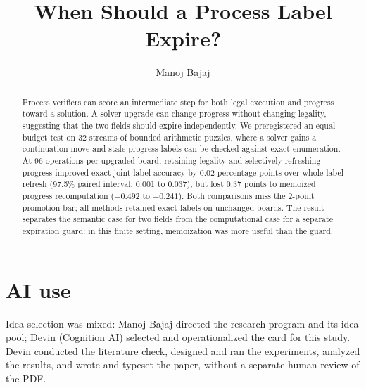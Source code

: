 \documentclass[11pt]{article}
\title{\textbf{When Should a Process Label Expire?}}
\author{Manoj Bajaj}
\date{}
\begin{document}
\maketitle
\begin{abstract}
Process verifiers can score an intermediate step for both legal execution and progress toward a solution.
A solver upgrade can change progress without changing legality, suggesting that the two fields should expire independently.
We preregistered an equal-budget test on 32 streams of bounded arithmetic puzzles, where a solver gains a continuation move and stale progress labels can be checked against exact enumeration.
At 96 operations per upgraded board, retaining legality and selectively refreshing progress improved exact joint-label accuracy by 0.02 percentage points over whole-label refresh (97.5\% paired interval: 0.001 to 0.037), but lost 0.37 points to memoized progress recomputation (\(-0.492\) to \(-0.241\)).
Both comparisons miss the 2-point promotion bar; all methods retained exact labels on unchanged boards.
The result separates the semantic case for two fields from the computational case for a separate expiration guard: in this finite setting, memoization was more useful than the guard.
\end{abstract}






\section*{AI use}
Idea selection was mixed: Manoj Bajaj directed the research program and its idea pool; Devin (Cognition AI) selected and operationalized the card for this study.
Devin conducted the literature check, designed and ran the experiments, analyzed the results, and wrote and typeset the paper, without a separate human review of the PDF.


\setlength{\bibsep}{2pt}

\clearpage
\appendix

\end{document}
